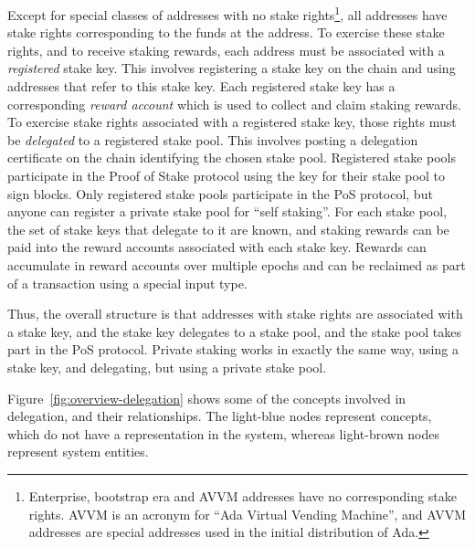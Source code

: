 \documentclass[11pt,a4paper]{article}
\begin{document}
Except for special classes of addresses with no stake rights\footnote{Enterprise,
  bootstrap era and AVVM addresses have no corresponding stake
  rights. AVVM is an acronym for ``Ada Virtual Vending Machine'', and AVVM
  addresses are special addresses used in the initial distribution of Ada.}, all
addresses have stake rights corresponding to the funds
at the address. To exercise these stake rights, and to receive staking
rewards, each address must be associated with a \emph{registered} stake
key. This involves registering a stake key on the chain and using
addresses that refer to this stake key. Each registered stake key has a
corresponding \emph{reward account} which is used to collect and claim
staking rewards. To exercise stake rights associated with a registered
stake key, those rights must be \emph{delegated} to a registered stake pool.
This involves posting a delegation certificate on the chain identifying
the chosen stake pool. Registered stake pools participate in the Proof
of Stake protocol using the key for their stake pool to sign blocks.
Only registered stake pools participate in the PoS protocol, but anyone
can register a private stake pool for ``self staking''. For each stake
pool, the set of stake keys that delegate to it are known, and staking
rewards can be paid into the reward accounts associated with each stake
key. Rewards can accumulate in reward accounts over multiple epochs and
can be reclaimed as part of a transaction using a special input type.

Thus, the overall structure is that addresses with stake rights are
associated with a stake key, and the stake key delegates to a stake
pool, and the stake pool takes part in the PoS protocol. Private staking
works in exactly the same way, using a stake key, and delegating, but
using a private stake pool.

Figure~\ref{fig:overview-delegation} shows some of the concepts involved in
delegation, and their relationships. The light-blue nodes represent concepts, which
do not have a representation in the system, whereas light-brown nodes represent
system entities.
\end{document}
